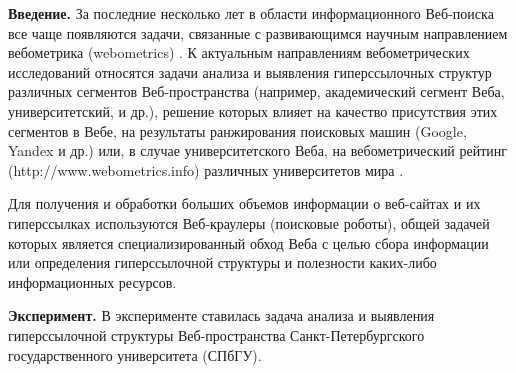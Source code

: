 

\textbf{Введение.} За последние несколько лет в области информационного Веб-поиска все чаще появляются задачи, связанные с развивающимся научным направлением вебометрика (webometrics) \cite{HolmbergThelwall,Pechnikov,PechnikovChirkovChuiko,BlekanovSergeevPechnikov}. К актуальным направлениям вебометрических исследований относятся задачи анализа и выявления гиперссылочных структур различных сегментов Веб-пространства (например, академический сегмент Веба, университетский, и др.), решение которых влияет на качество присутствия этих сегментов в Вебе, на результаты ранжирования поисковых машин (Google, Yandex и др.) или, в случае университетского Веба, на вебометрический рейтинг (http://www.webometrics.info) различных университетов мира \cite{BlekanovSergeevPechnikov}.

 Для получения и обработки больших объемов информации о веб-сайтах и их гиперссылках используются Веб-краулеры (поисковые роботы), общей задачей которых является специализированный обход Веба с целью сбора информации или определения гиперссылочной структуры и полезности каких-либо информационных ресурсов.
 
\textbf{ Эксперимент.} В эксперименте ставилась задача анализа и выявления гиперссылочной структуры Веб-пространства Санкт-Петербургского государственного университета (СПбГУ). 
 
